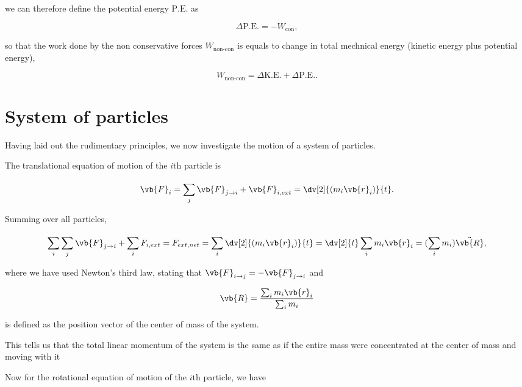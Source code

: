 \documentclass[a4paper,12pt]{report}
\begin{document}
we can therefore define the potential energy \(\text{P.E.} \) as 

\begin{equation}
	\Delta \text{P.E.}  = - W_{\text{con} }, 
\end{equation}

so that the work done by the non conservative forces \(W_{\text{non-con} } \) is equals to change in total mechnical energy (kinetic energy plus potential energy), 

\begin{equation}
	W_{\text{non-con} } = \Delta \text{K.E.}  + \Delta \text{P.E.}.  
\end{equation}


\section{System of particles}
Having laid out the rudimentary principles, we now investigate the motion of a system of particles.

The translational equation of motion of the \(i \text{th} \) particle is 

\begin{equation}
	\vb{F} _{i} = \sum_{j}^{} \vb{F} _{j \rightarrow i} + \vb{F} _{i, ext} = \dv[2]{(m_{i} \vb{r} _{i} )}{t}     .
\end{equation}
 
Summing over all particles,

\begin{equation}
	\sum_{i}^{} \sum_{j}^{} \vb{F} _{j \rightarrow i} + \sum_{i}^{} F_{i,ext} = F_{ext, net } =  \sum_{i}^{} \dv[2]{(m_{i} \vb{r} _{i} )}{t} = \dv[2]{t} \sum_{i}^{} m_{i} \vb{r} _{i} =  (\sum_{i}^{} m_{i} ) \ddot{\vb{R} },
\end{equation}

where we have used Newton's third law, stating that \(\vb{F} _{i \rightarrow j} = -\vb{F} _{j \rightarrow i} \) and  

\begin{equation}
	\vb{R} = \frac{\sum_{i}^{} m_{i} \vb{r} _{i} }{\sum_{i}^{} m_{i}  } 
\end{equation}

is defined as the position vector of the center of mass of the system.

This tells us that the total linear momentum of the system is the same as if the entire mass were concentrated at the center of mass and moving with it

Now for the rotational equation of motion of the \(i \text{th} \) particle, we have
\end{document}
